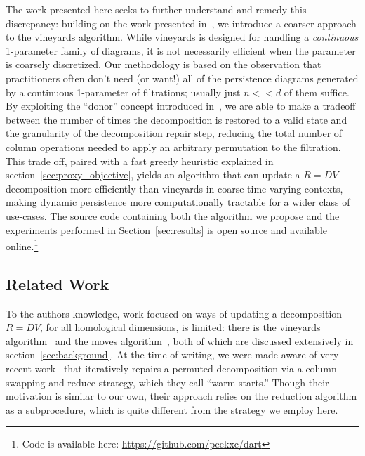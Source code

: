 \documentclass[sn-mathphys]{sn-jnl}
\begin{document}
The work presented here seeks to further understand and remedy this discrepancy: building on the work presented in~\cite{busaryev2010tracking}, we introduce a coarser approach to the vineyards algorithm.
While vineyards is  designed  for handling a \emph{continuous} 1-parameter family of diagrams, it is not necessarily efficient when the parameter is coarsely discretized.
Our methodology is based on the observation that practitioners often don't need (or want!) all of the persistence diagrams generated by a continuous 1-parameter of filtrations; usually just $n << d$ of them  suffice.   
By exploiting the ``donor'' concept introduced in~\cite{busaryev2010tracking}, we are able to make a tradeoff between the number of times the decomposition is restored to a valid state and the granularity of the decomposition repair step, reducing the total number of column operations needed to apply an arbitrary permutation to the filtration. This trade off, paired with a fast greedy heuristic explained in section~\ref{sec:proxy_objective}, yields an algorithm that can update a $R = DV$ decomposition more efficiently than vineyards in coarse time-varying contexts, making dynamic persistence more computationally tractable for a wider class of use-cases. 
The source code containing both the algorithm we propose and the experiments performed in Section~\ref{sec:results} is open source and available online.\footnote{ Code is available here: \url{https://github.com/peekxc/dart}}
  
\subsection{Related Work}\label{sec:related_work} 
To the authors knowledge, work focused on ways of updating a  decomposition $R = DV$, for all homological dimensions, is limited: there is the vineyards algorithm~\cite{cohen2006vines} and the moves algorithm~\cite{busaryev2010tracking}, both of which are discussed extensively in section~\ref{sec:background}. At the time of writing, we were made aware of very recent work~\cite{luo2021accelerating} that iteratively repairs a permuted decomposition via a column swapping and reduce strategy, which they call ``warm starts.'' Though their motivation is similar to our own, their approach relies on the reduction algorithm as a subprocedure, which is quite different from the strategy we employ here.
\end{document}
